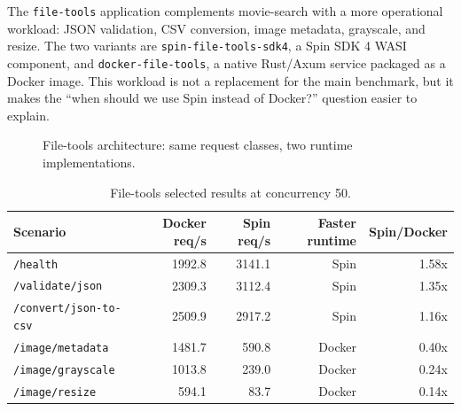 \documentclass[11pt,a4paper]{article}
\begin{document}
The \texttt{file-tools} application complements movie-search with a more operational workload:
JSON validation, CSV conversion, image metadata, grayscale, and resize. The two variants are
\texttt{spin-file-tools-sdk4}, a Spin SDK 4 WASI component, and \texttt{docker-file-tools}, a
native Rust/Axum service packaged as a Docker image. This workload is not a replacement for the
main benchmark, but it makes the ``when should we use Spin instead of Docker?'' question easier
to explain.

\begin{figure}[H]
\centering
{}
\caption{File-tools architecture: same request classes, two runtime implementations.}
\end{figure}

\begin{table}[H]
\centering
\caption{File-tools selected results at concurrency 50.}
\begin{tabular}{lrrrr}
\toprule
Scenario & Docker req/s & Spin req/s & Faster runtime & Spin/Docker \\
\midrule
\texttt{/health} & 1992.8 & 3141.1 & Spin & 1.58x \\
\texttt{/validate/json} & 2309.3 & 3112.4 & Spin & 1.35x \\
\texttt{/convert/json-to-csv} & 2509.9 & 2917.2 & Spin & 1.16x \\
\texttt{/image/metadata} & 1481.7 & 590.8 & Docker & 0.40x \\
\texttt{/image/grayscale} & 1013.8 & 239.0 & Docker & 0.24x \\
\texttt{/image/resize} & 594.1 & 83.7 & Docker & 0.14x \\
\bottomrule
\end{tabular}
\end{table}
\end{document}
